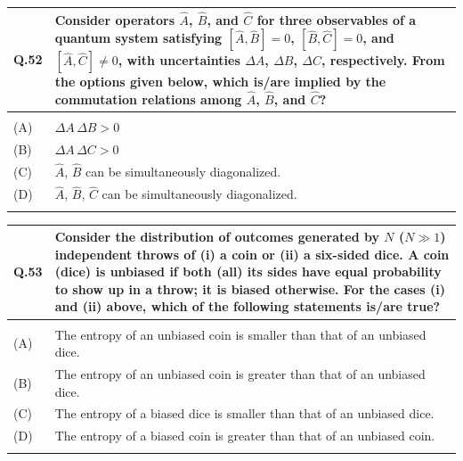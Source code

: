 \documentclass[12pt,a4paper]{article}
\begin{document}
\begin{table}[h!]
\begin{tabular}{|p{}|p{}|}
\hline
\textbf{Q.52} &
Consider operators $\hat{A}$, $\hat{B}$, and $\hat{C}$ for three observables of a quantum system satisfying $[\hat{A}, \hat{B}] = 0$, $[\hat{B}, \hat{C}] = 0$, and $[\hat{A}, \hat{C}] \neq 0$, with uncertainties $\Delta A$, $\Delta B$, $\Delta C$, respectively. From the options given below, which is/are implied by the commutation relations among $\hat{A}$, $\hat{B}$, and $\hat{C}$? \\
\hline
& \\
\hline
(A) & $\Delta A\, \Delta B > 0$ \\
\hline
(B) & $\Delta A\, \Delta C > 0$ \\
\hline
(C) & $\hat{A}$, $\hat{B}$ can be simultaneously diagonalized. \\
\hline
(D) & $\hat{A}$, $\hat{B}$, $\hat{C}$ can be simultaneously diagonalized. \\
\hline
& \\
\hline
\end{tabular}
\end{table}

\bigskip

\begin{table}[h!]
\begin{tabular}{|p{}|p{}|}
\hline
\textbf{Q.53} &
Consider the distribution of outcomes generated by $N$ ($N \gg 1$) independent throws of (i) a coin or (ii) a six-sided dice. A coin (dice) is unbiased if both (all) its sides have equal probability to show up in a throw; it is biased otherwise. For the cases (i) and (ii) above, which of the following statements is/are true? \\
\hline
& \\
\hline
(A) & The entropy of an unbiased coin is smaller than that of an unbiased dice. \\
\hline
(B) & The entropy of an unbiased coin is greater than that of an unbiased dice. \\
\hline
(C) & The entropy of a biased dice is smaller than that of an unbiased dice. \\
\hline
(D) & The entropy of a biased coin is greater than that of an unbiased coin. \\
\hline
& \\
\hline
\end{tabular}
\end{table}
\end{document}
